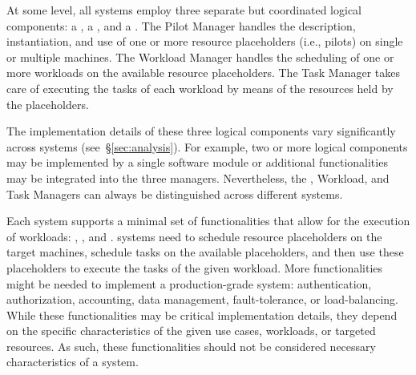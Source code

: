 \documentclass{sig-alternate}
\begin{document}
At some level, all \pilotjob systems employ three separate but coordinated
logical components: a , a , and a
. The Pilot Manager handles the description, instantiation,
and use of one or more resource placeholders (i.e., pilots) on single or
multiple machines. The Workload Manager handles the scheduling of one or more
workloads on the available resource placeholders. The Task Manager takes care of
executing the tasks of each workload by means of the resources held by the
placeholders.

The implementation details of these three logical components vary significantly
across \pilotjob systems (see~\S\ref{sec:analysis}). For example, two or more
logical components may be implemented by a single software module or additional
functionalities may be integrated into the three managers. Nevertheless, the
\pilot, Workload, and Task Managers can always be distinguished across different
\pilotjob systems.



Each \pilotjob system supports a minimal set of functionalities that allow for
the execution of workloads: , , and . \pilotjob systems need to schedule
resource placeholders on the target machines, schedule tasks on the available
placeholders, and then use these placeholders to execute the tasks of the given
workload. More functionalities might be needed to implement a production-grade
\pilotjob system: authentication, authorization, accounting, data management,
fault-tolerance, or load-balancing. While these functionalities may be critical
implementation details, they depend on the specific characteristics of the given
use cases, workloads, or targeted resources. As such, these functionalities
should not be considered necessary characteristics of a \pilotjob system.
\end{document}
